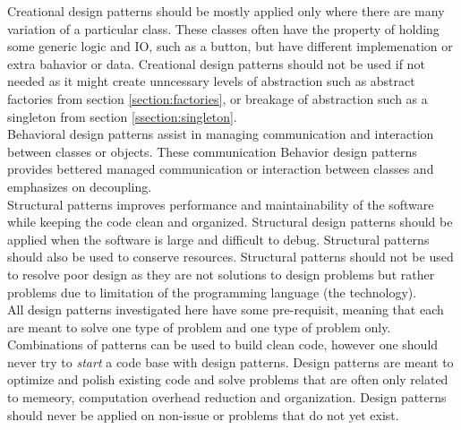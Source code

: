 \begin{multicols}{2}
Creational design patterns should be mostly applied only where there are many variation of a particular class. These classes often have the property of holding some generic logic and IO, such as a button, but have different implemenation or extra bahavior or data. Creational design patterns should not be used if not needed as it might create unncessary levels of abstraction such as abstract factories from section \ref{section:factories}, or breakage of abstraction such as a singleton from section \ref{ssection:singleton}.\bs
\\
Behavioral design patterns assist in managing communication and interaction between classes or objects. These communication Behavior design patterns provides bettered managed communication or interaction between classes and emphasizes on decoupling.\bs
\\
Structural patterns improves performance and maintainability of the software while keeping the code clean and organized. Structural design patterns should be applied when the software is large and difficult to debug. Structural patterns should also be used to conserve resources. Structural patterns should not be used to resolve poor design as they are not solutions to design problems but rather problems due to limitation of the programming language (the technology).\bs
\\
All design patterns investigated here have some pre-requisit, meaning that each are meant to solve one type of problem and one type of problem only. Combinations of patterns can be used to build clean code, however one should never try to \textit{start} a code base with design patterns. Design patterns are meant to optimize and polish existing code and solve problems that are often only related to memeory, computation overhead reduction and organization. Design patterns should never be applied on non-issue or problems that do not yet exist.

\iftwocolumns
\end{multicols}
\fi